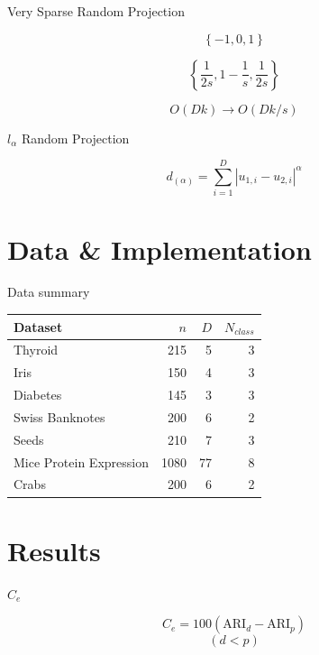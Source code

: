 \documentclass[ignorenonframetext,]{beamer}
\begin{document}
\begin{frame}{Very Sparse Random Projection}

\[\left\{ -1, 0, 1 \right\}\]

\[\left\{ \frac{1}{2s}, 1 - \frac{1}{s}, \frac{1}{2s} \right\}\]

\[ O(Dk) \rightarrow O(Dk/s) \]

\end{frame}

\begin{frame}{\(l_\alpha\) Random Projection}

\[d_{(\alpha)} = \sum_{i=1}^D \left| u_{1,i} - u_{2,i} \right|^{\alpha}\]

\end{frame}

\section{Data \& Implementation}\label{data-implementation}

\begin{frame}{Data summary}

\begin{center}


\begin{tabular}{l|r|r|r}
\hline
Dataset & $n$ & $D$ & $N_{class}$\\
\hline
Thyroid & 215 & 5 & 3\\
\hline
Iris & 150 & 4 & 3\\
\hline
Diabetes & 145 & 3 & 3\\
\hline
Swiss Banknotes & 200 & 6 & 2\\
\hline
Seeds & 210 & 7 & 3\\
\hline
Mice Protein Expression & 1080 & 77 & 8\\
\hline
Crabs & 200 & 6 & 2\\
\hline
\end{tabular}

\end{center}

\end{frame}

\section{Results}\label{results}

\begin{frame}{\(C_e\)}

\[ C_e = 100 (\mathrm{ARI}_d - \mathrm{ARI}_p  ) \] \[ (d<p) \]

\end{frame}
\end{document}
